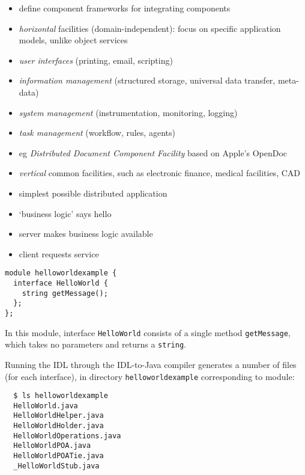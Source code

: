 \documentclass{sepslide-soa-faked} %
\begin{document}
\begin{slide}
\begin{itemize}
\item define component frameworks for integrating components
\item \emph{horizontal} facilities (domain-independent):
  focus on specific application models, unlike object services
\item \emph{user interfaces}
  (printing, email, scripting)
\item \emph{information management}
  (structured storage, universal data transfer, meta-data)
\item \emph{system management}
  (instrumentation, monitoring, logging)
\item \emph{task management}
  (workflow, rules, agents)
\item eg \emph{Distributed Document Component Facility} based on Apple's OpenDoc
\item \emph{vertical} common facilities, such as electronic finance,
medical facilities, CAD 
\end{itemize}
\end{slide}

\begin{slide}
\begin{itemize}
\item simplest possible distributed application
\item `business logic' says hello
\item server makes business logic available
\item client requests service
\end{itemize}
\end{slide}

\begin{slide}
\begin{verbatim}
module helloworldexample {
  interface HelloWorld {
    string getMessage();
  };
};
\end{verbatim}
In this module, interface \texttt{HelloWorld} consists of a single method
\texttt{getMessage}, which takes no parameters and returns a
\texttt{string}. 
\end{slide}

\begin{slide}
Running the IDL through the IDL-to-Java compiler
generates a number of files (for each interface),
in directory \texttt{helloworldexample} corresponding to module:
\begin{verbatim}
  $ ls helloworldexample
  HelloWorld.java        
  HelloWorldHelper.java  
  HelloWorldHolder.java      
  HelloWorldOperations.java  
  HelloWorldPOA.java
  HelloWorldPOATie.java
  _HelloWorldStub.java
\end{verbatim}
\end{slide}
\end{document}

